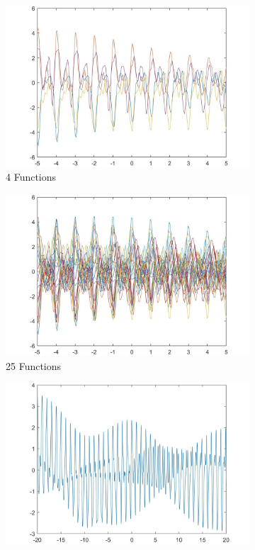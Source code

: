 \documentclass[twoside,twocolumn]{article}
\begin{document}
\begin{figure}[h]
\centering
    \begin{subfigure}[t]{0.49\linewidth}
        \centering
        \includegraphics[width=\textwidth]{c_1_4_1}
        \caption{4 Functions}
        \label{sub:r1}
    \end{subfigure}%
    \begin{subfigure}[t]{0.49\linewidth}
        \centering
        \includegraphics[width=\textwidth]{c_1_4_2}
        \caption{25 Functions}
        \label{sub:r2}
    \end{subfigure}%
    \newline
    \begin{subfigure}[t]{0.49\linewidth}
        \centering
        \includegraphics[width=\textwidth]{c_1_4_3}

\end{subfigure}
\end{figure}
\end{document}
